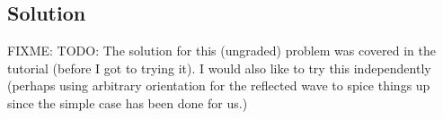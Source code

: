 \subsection{Solution}

FIXME: TODO: The solution for this (ungraded) problem was covered in the tutorial (before I got to trying it).  I would also like to try this independently (perhaps using arbitrary orientation for the reflected wave to spice things up since the simple case has been done for us.)

\EndArticle
